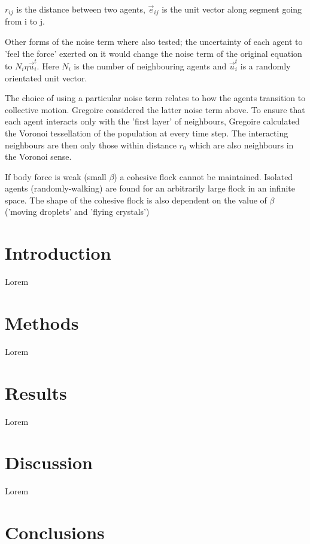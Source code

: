 \documentclass[10pt,twocolumn]{revtex4-2}    %
\begin{document}
$r_{ij}$ is the distance between two agents, $\vec{e}_{ij}$ is the unit vector along segment going from i to j.

Other forms of the noise term where also tested; the uncertainty of each agent to 'feel the force' exerted on it would change the noise term of the original equation to $N_i \eta \vec{u}_i^t$. Here $N_i$ is the number of neighbouring agents and $\vec{u}_i^t$ is a randomly orientated unit vector. 

The choice of using a particular noise term relates to how the agents transition to collective motion. Gregoire considered the latter noise term above. To ensure that each agent interacts only with the 'first layer' of neighbours, Gregoire calculated the Voronoi tessellation of the population at every time step. The interacting neighbours are then only those within distance $r_0$ which are also neighbours in the Voronoi sense. 

If body force is weak (small $\beta$) a cohesive flock cannot be maintained. Isolated agents (randomly-walking) are found for an arbitrarily large flock in an infinite space. The shape of the cohesive flock is also dependent on the value of $\beta$ ('moving droplets' and 'flying crystals')








\section{Introduction} 

Lorem 

\section{Methods} 

Lorem 
 
\section{Results} 

Lorem 
\section{Discussion} 

Lorem 


\section{Conclusions}
 
\end{document}
